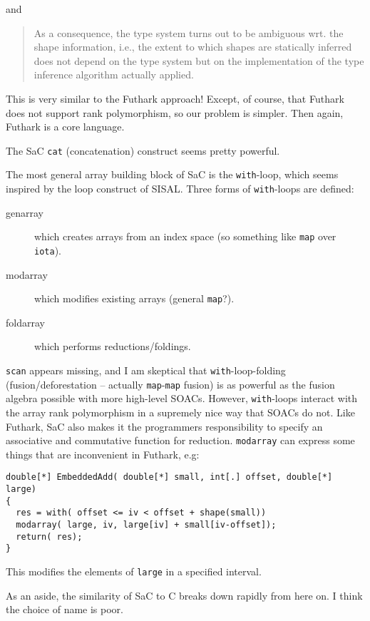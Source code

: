 \documentclass[a4paper, oneside, final]{memoir}
\begin{document}
and

\begin{quote}
  As a consequence, the type system turns out to be ambiguous wrt. the
  shape information, i.e., the extent to which shapes are statically
  inferred does not depend on the type system but on the
  implementation of the type inference algorithm actually applied.
\end{quote}

This is very similar to the Futhark approach!  Except, of course, that
Futhark does not support rank polymorphism, so our problem is simpler.
Then again, Futhark is a core language.

The SaC \texttt{cat} (concatenation) construct seems pretty powerful.

The most general array building block of SaC is the
\texttt{with}-loop, which seems inspired by the loop construct of
SISAL.  Three forms of \texttt{with}-loops are defined:

\begin{description}
\item[genarray] which creates arrays from an index space (so something
  like \texttt{map} over \texttt{iota}).
\item[modarray] which modifies existing arrays (general \texttt{map}?).
\item[foldarray] which performs reductions/foldings.
\end{description}

\texttt{scan} appears missing, and I am skeptical that
\texttt{with}-loop-folding (fusion/deforestation -- actually
\texttt{map}-\texttt{map} fusion) is as powerful as the fusion algebra
possible with more high-level SOACs.  However, \texttt{with}-loops
interact with the array rank polymorphism in a supremely nice way that
SOACs do not.  Like Futhark, SaC also makes it the programmers
responsibility to specify an associative and commutative function for
reduction.  \texttt{modarray} can express some things that are
inconvenient in Futhark, e.g:

\begin{verbatim}
double[*] EmbeddedAdd( double[*] small, int[.] offset, double[*] large)
{
  res = with( offset <= iv < offset + shape(small))
  modarray( large, iv, large[iv] + small[iv-offset]);
  return( res);
}
\end{verbatim}

This modifies the elements of \texttt{large} in a specified interval.

As an aside, the similarity of SaC to C breaks down rapidly from here
on.  I think the choice of name is poor.
\end{document}
